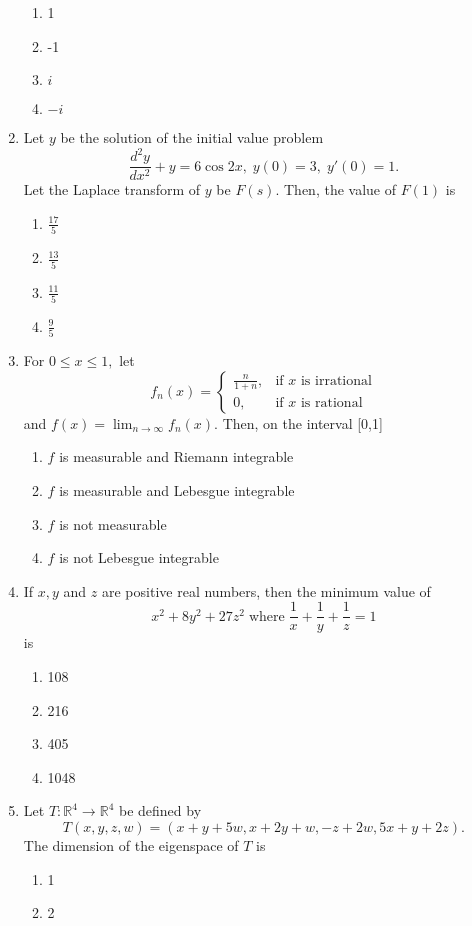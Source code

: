 \documentclass[journal,12pt,onecolumn]{IEEEtran}
\theoremstyle{remark}
\begin{document}
\begin{enumerate}[start=27]
\begin{enumerate}
    \item 1
    \item -1
    \item $i$
    \item $-i$
\end{enumerate}
\item Let $y$ be the solution of the initial value problem $$\frac{d^2y}{dx^2}+y=6\cos{2x}, \; y(0)=3, \; y'(0)=1.$$ Let the Laplace transform of $y$ be $F(s)$. Then, the value of $F(1)$ is
\begin{enumerate}
    \item $\frac{17}{5}$
    \item $\frac{13}{5}$
    \item $\frac{11}{5}$
    \item $\frac{9}{5}$
\end{enumerate}
\item For $0\leq x\leq 1,$ let $$f_n(x) = 
\begin{cases} 
\frac{n}{1+n}, & \text{if } x \text{ is irrational} \\
0, & \text{if } x \text{ is rational}
\end{cases}$$ and $f(x)=\lim_{n \to \infty}f_n(x).$ Then, on the interval [0,1]
\begin{enumerate}
    \item $f$ is measurable and Riemann integrable
    \item $f$ is measurable and Lebesgue integrable
    \item $f$ is not measurable
    \item $f$ is not Lebesgue integrable
\end{enumerate}
\item If $x, y$ and $z$ are positive real numbers, then the minimum value of $$x^2+8y^2+27z^2 \; \text{where} \; \frac{1}{x}+\frac{1}{y}+\frac{1}{z}=1$$ is
\begin{enumerate}
    \item 108
    \item 216
    \item 405
    \item 1048
\end{enumerate}
\item Let $T:\mathbb{R}^4 \to \mathbb{R}^4$ be defined by $$T(x,y,z,w)=(x+y+5w,x+2y+w,-z+2w,5x+y+2z).$$ The dimension of the eigenspace of $T$ is
\begin{enumerate}
    \item 1
    \item 2

\end{enumerate}
\end{enumerate}
\end{document}
